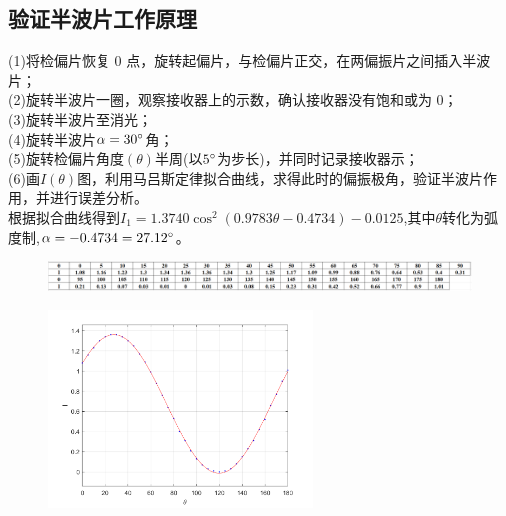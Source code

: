 \documentclass{article}
\begin{document}
\subsection{验证半波片工作原理}
(1)将检偏片恢复 0 点，旋转起偏片，与检偏片正交，在两偏振片之间插入半波片；\\
(2)旋转半波片一圈，观察接收器上的示数，确认接收器没有饱和或为 0；\\
(3)旋转半波片至消光；\\
(4)旋转半波片$\alpha=30\degree$角；\\
(5)旋转检偏片角度$(\theta)$半周(以$5\degree$为步长)，并同时记录接收器示；\\
(6)画\(I(\theta)\)图，利用马吕斯定律拟合曲线，求得此时的偏振极角，验证半波片作用，并进行误差分析。\\
\hspace*{2em}根据拟合曲线得到$I_1=1.3740\cos^2(0.9783\theta-0.4734)-0.0125$,其中$\theta$转化为弧度制,$\alpha=-0.4734=27.12\degree$。
\begin{figure}[ht]
    \centering
    \includegraphics[width=12cm]{5.2.png}
\end{figure}
\begin{figure}[!h]
    \centering
    \includegraphics[width=7cm]{2.png}
\end{figure}
\end{document}
